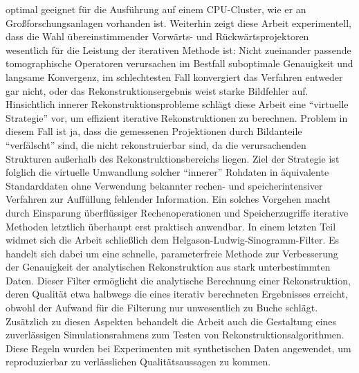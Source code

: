 {optimal geeignet f\"{u}r die Ausf\"{u}hrung auf einem CPU-Cluster, wie er an Gro\ss{}forschungsanlagen vorhanden ist.
\newline\newline
Weiterhin zeigt diese Arbeit experimentell, dass die Wahl \"{u}bereinstimmender Vorw\"{a}rts- und R\"{u}ckw\"{a}rtsprojektoren wesentlich f\"{u}r die
Leistung der iterativen Methode ist: Nicht zueinander passende tomographische Operatoren verursachen im Bestfall suboptimale Genauigkeit
und langsame Konvergenz, im schlechtesten Fall konvergiert das Verfahren entweder gar nicht, oder das Rekonstruktionsergebnis weist starke Bildfehler auf.
\newline\newline
Hinsichtlich innerer Rekonstruktionsprobleme schl\"{a}gt diese Arbeit eine ``virtuelle Strategie'' vor, um effizient iterative Rekonstruktionen zu berechnen.
Problem in diesem Fall ist ja, dass die gemessenen Projektionen durch Bildanteile ``verf\"{a}lscht'' sind, die nicht rekonstruierbar sind, da die
verursachenden Strukturen au\ss{}erhalb des Rekonstruktionsbereichs liegen. Ziel der Strategie ist folglich die virtuelle Umwandlung solcher
``innerer'' Rohdaten in \"{a}quivalente Standarddaten ohne Verwendung bekannter rechen- und speicherintensiver Verfahren zur Auff\"{u}llung fehlender
Information. Ein solches Vorgehen macht durch Einsparung \"{u}berfl\"{u}ssiger Rechenoperationen und Speicherzugriffe iterative Methoden letztlich
\"{u}berhaupt erst praktisch anwendbar.
\newline\newline
In einem letzten Teil widmet sich die Arbeit schlie\ss{}lich dem Helgason-Ludwig-Sinogramm-Filter. Es handelt sich dabei um eine schnelle,
parameterfreie Methode zur Verbesserung der Genauigkeit der analytischen Rekonstruktion aus stark unterbestimmten Daten. Dieser Filter
erm\"{o}glicht die analytische Berechnung einer Rekonstruktion, deren Qualit\"{a}t etwa halbwegs die eines iterativ berechneten Ergebnisses erreicht,
obwohl der Aufwand f\"{u}r die Filterung nur unwesentlich zu Buche schl\"{a}gt.
\newline\newline
Zus\"{a}tzlich zu diesen Aspekten behandelt die Arbeit auch die Gestaltung eines zuverl\"{a}ssigen Simulationsrahmens zum Testen von Rekonstruktionsalgorithmen.
Diese Regeln wurden bei Experimenten mit synthetischen Daten angewendet, um reproduzierbar zu verl\"{a}sslichen Qualit\"{a}tsaussagen zu kommen.
\newline\newline
}
